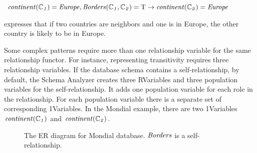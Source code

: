 \documentclass{acm_proc_article-sp}
\begin{document}
\begin{small}
$\it{continent}(\mathbb{C}_{1}) = \it{Europe}, \it{Borders}(\mathbb{C}_{1}, \mathbb{C}_{2}) = \mathrm{T} \rightarrow \\\it{continent}(\mathbb{C}_{2}) = \it{Europe}$
\end{small}

expresses that if two countries are neighbors and one is in Europe, the other country is likely to be in Europe. 

Some complex patterns require more than one relationship variable for the same relationship functor. For instance, representing transitivity requires three relationship variables.
If the database schema contains a self-relationship, 
by default, the Schema Analyzer creates three RVariables and three population variables for the self-relationship.
It adds one population variable for each role in the relationship. For each population variable there is a separate set of corresponding 1Variables. In the Mondial example, there are two 1Variables $\it{continent}(\mathbb{C}_{1})$ and $\it{continent}(\mathbb{C}_{2})$.
\begin{figure}[htbp] %
 \centering
{} 
\caption{The ER diagram for Mondial database. $\it{Borders}$ is a self-relationship. 
}
 \label{fig:mondial-er}
\end{figure}
\end{document}
